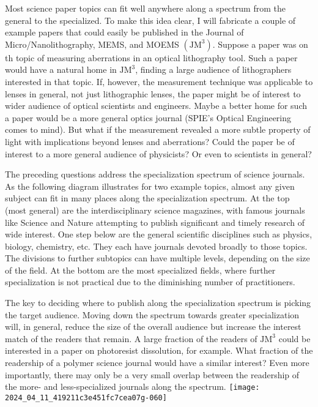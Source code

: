 Most science paper topics can fit well anywhere along a spectrum from the general to the specialized. To make this idea clear, I will fabricate a couple of example papers that could easily be published in the Journal of Micro/Nanolithography, MEMS, and MOEMS $\left(\mathrm{JM}^{3}\right)$. Suppose a paper was on th topic of measuring aberrations in an optical lithography tool. Such a paper would have a natural home in $\mathrm{JM}^{3}$, finding a large audience of lithographers interested in that topic. If, however, the measurement technique was applicable to lenses in general, not just lithographic lenses, the paper might be of interest to wider audience of optical scientists and engineers. Maybe a better home for such a paper would be a more general optics journal (SPIE's Optical Engineering comes to mind). But what if the measurement revealed a more subtle property of light with implications beyond lenses and aberrations? Could the paper be of interest to a more general audience of physicists? Or even to scientists in general?

The preceding questions address the specialization spectrum of science journals. As the following diagram illustrates for two example topics, almost any given subject can fit in many places along the specialization spectrum. At the top (most general) are the interdisciplinary science magazines, with famous journals like Science and Nature attempting to publish significant and timely research of wide interest. One step below are the general scientific disciplines such as physics, biology, chemistry, etc. They each have journals devoted broadly to those topics. The divisions to further subtopics can have multiple levels, depending on the size of the field. At the bottom are the most specialized fields, where further specialization is not practical due to the diminishing number of practitioners.

The key to deciding where to publish along the specialization spectrum is picking the target audience. Moving down the spectrum towards greater specialization will, in general, reduce the size of the overall audience but increase the interest match of the readers that remain. A large fraction of the readers of $\mathrm{JM}^{3}$ could be interested in a paper on photoresist dissolution, for example. What fraction of the readership of a polymer science journal would have a similar interest? Even more importantly, there may only be a very small overlap between the readership of the more- and less-specialized journals along the spectrum.
\texttt{[image: 2024\_04\_11\_419211c3e451fc7cea07g-060]}

